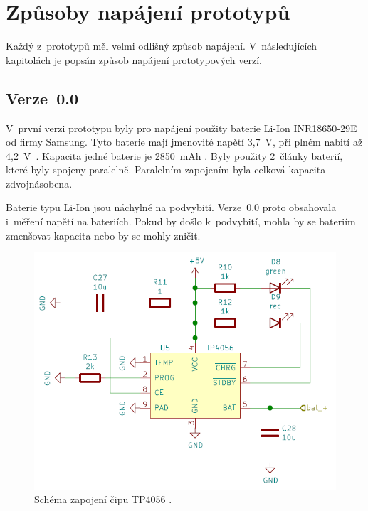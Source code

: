   \section{Způsoby napájení prototypů}
  Každý z~prototypů měl velmi odlišný způsob napájení. V~následujících kapitolách je popsán způsob napájení prototypových verzí.

  \subsection{Verze~0.0}
  V~první verzi prototypu byly pro napájení použity baterie Li-Ion INR18650-29E od firmy Samsung. Tyto baterie mají jmenovité napětí 3,7~V, 
  při plném nabití až 4,2~V~\cite{18650}. Kapacita jedné baterie je 2850~mAh \cite{18650}. Byly použity 2~články baterií, které byly spojeny 
  paralelně. Paralelním zapojením byla celková kapacita zdvojnásobena.

  Baterie typu Li-Ion jsou náchylné na podvybití. Verze~0.0 proto obsahovala i~měření napětí na bateriích. Pokud by došlo k~podvybití, mohla 
  by se bateriím zmenšovat kapacita nebo by se mohly zničit. 

  \begin{figure}[!h]
    \begin{center}
      \includegraphics[scale=0.6]{obrazky/TP4056_schema.png}
    \end{center}
    \caption[Schéma zapojení čipu TP4056 \cite{TP4056_datasheet}]{Schéma zapojení čipu TP4056 \cite{TP4056_datasheet}.}
  \end{figure}

